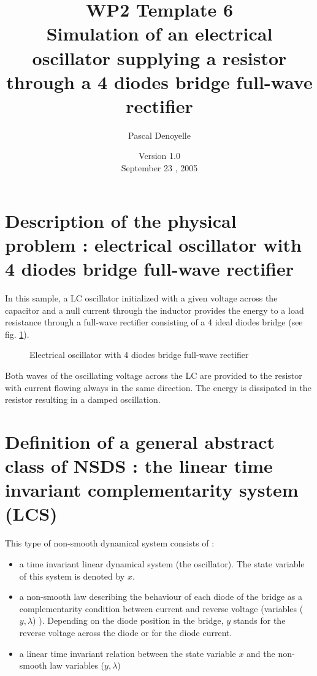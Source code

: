 \documentclass[10pt]{article}
\begin{document}
\thispagestyle{empty}
\title{WP2 Template 6 \\Simulation of an electrical oscillator supplying a resistor\\
through a 4 diodes bridge full-wave rectifier}
\author{Pascal Denoyelle}

\date{Version 1.0 \\
 September 23 , 2005}
\maketitle


\pagestyle{fancy}

\section{Description of the physical problem : electrical oscillator with 4 diodes bridge full-wave rectifier}
In this sample, a LC oscillator initialized with a given voltage across the capacitor and a null current through
the inductor provides the energy
to a load resistance through a full-wave rectifier consisting of a 4 ideal diodes bridge (see fig. \ref{fig-DiodeBridge}).

\begin{figure}[hp]
\centerline{
  \scalebox{0.75}{
     
  }
}
\caption{Electrical oscillator with 4 diodes bridge full-wave rectifier}
\label{fig-DiodeBridge}
\end{figure}

Both waves of the oscillating voltage across the LC are provided to the resistor with current flowing always in 
the same direction. The energy is dissipated in the resistor resulting in a damped oscillation.


\section{Definition of a general abstract class of NSDS : the linear time invariant complementarity system (LCS)}
\label{sec-def-NSDS}
This type of non-smooth dynamical system consists of :

\begin{itemize}
\item a time invariant linear dynamical system (the oscillator). The state variable of this system is denoted by $x$.
\item a non-smooth law describing the behaviour of each diode of the bridge as a complementarity condition between current and
reverse voltage (variables ($y,\lambda$) ). Depending on the diode position in the bridge, $y$ stands for the reverse voltage 
across the diode or for the diode current.
\item a linear time invariant relation between the state variable $x$ and the non-smooth law variables ($y,\lambda$)
\end{itemize}
\end{document}
